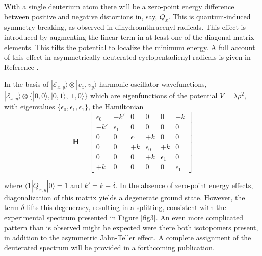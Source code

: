 \documentclass[journal=jacsat,manuscript=article,layout=onecolumn]{achemso}
\begin{document}
With a single deuterium atom there will be a zero-point energy difference between positive and negative distortions in, say, $Q_x$. This is quantum-induced symmetry-breaking, as observed in dihydroanthracenyl radicals.\cite{kre19} This effect is introduced by augmenting the linear term in at least one of the diagonal matrix elements. This tilts the potential to localize the minimum energy.\cite{lia93} A full account of this effect in asymmetrically deuterated cyclopentadienyl radicals is given in Reference .

In the basis of $|\mathcal{E}_{x,y}\rangle\otimes|v_x,v_y\rangle$ harmonic oscillator wavefunctions, $|\mathcal{E}_{x,y}\rangle\otimes\{|0,0\rangle, |0,1\rangle, |1,0\rangle\}$ which are eigenfunctions of the potential $V = \lambda \rho^2$, with eigenvalues $\{\epsilon_0,\epsilon_1,\epsilon_1\}$, the Hamiltonian
\begin{equation}\label{JT2}
  \mathbf{H} = \left[\begin{array}{cccccc}
                      \epsilon_0 & -k' & 0 & 0 & 0 & +k\\
                      -k' & \epsilon_1 & 0 & 0 & 0 & 0 \\
                      0 & 0 & \epsilon_1 & +k & 0 & 0 \\
                      0 & 0 & +k & \epsilon_0 & +k & 0\\
                      0 & 0 & 0 & +k & \epsilon_1 & 0\\
                      +k & 0 & 0 & 0 & 0 & \epsilon_1 
                     \end{array}
    \right]
\end{equation}

where $\langle1|Q_{x,y}|0\rangle=1$ and $k'=k-\delta$. In the absence of zero-point energy effects, diagonalization of this matrix yields a degenerate ground state. However, the term $\delta$ lifts this degeneracy, resulting in a splitting, consistent with the experimental spectrum presented in Figure \ref{fig3}. An even more complicated pattern than is observed might be expected were there both isotopomers present, in addition to the asymmetric Jahn-Teller effect. A complete assignment of the deuterated spectrum will be provided in a forthcoming publication.
\end{document}
